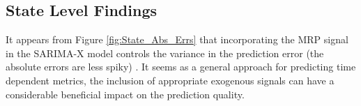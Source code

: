 \documentclass[12pt]{article}
\begin{document}
\subsection*{State Level Findings}	
It appears from Figure \ref{fig:State_Abs_Errs} that incorporating the MRP signal in the SARIMA-X model controls the variance in the prediction error (the absolute errors are less spiky) . It seems as a general approach for predicting time dependent metrics, the inclusion of appropriate exogenous signals can have a considerable beneficial impact on the prediction quality.





\end{document}

